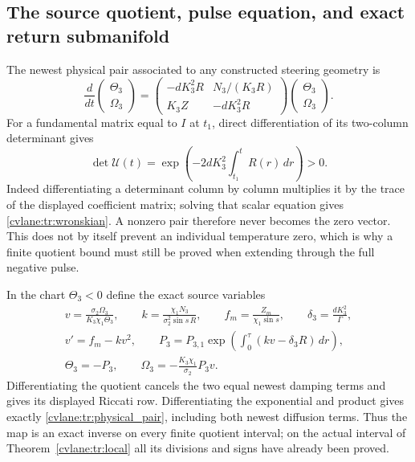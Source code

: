 \subsection{The source quotient, pulse equation, and exact return submanifold}

The newest physical pair associated to any constructed steering
geometry is
\begin{equation}\label{cvlane:tr:physical_pair}
 \frac d{dt}\begin{pmatrix}\Theta_3\\\Omega_3\end{pmatrix}
 =\begin{pmatrix}
 -dK_3^2R&N_3/(K_3R)\\
 K_3Z&-dK_3^2R
 \end{pmatrix}
 \begin{pmatrix}\Theta_3\\\Omega_3\end{pmatrix}.
\end{equation}
For a fundamental matrix equal to $I$ at $t_1$, direct
differentiation of its two-column determinant gives
\begin{equation}\label{cvlane:tr:wronskian}
 \det\mathcal U(t)=
 \exp\left(-2dK_3^2\int_{t_1}^tR(r)\,dr\right)>0.
\end{equation}
Indeed differentiating a determinant column by column multiplies it
by the trace of the displayed coefficient matrix; solving that scalar
equation gives \eqref{cvlane:tr:wronskian}. A nonzero pair therefore never
becomes the zero vector. This does not by itself prevent an individual
temperature zero, which is why a finite quotient bound must still be
proved when extending through the full negative pulse.

In the chart $\Theta_3<0$ define the exact source variables
\begin{equation}\label{cvlane:tr:quotient}
 \begin{gathered}
 v=\frac{\sigma_2\Omega_3}{K_3\chi_1\Theta_3},\qquad
 k=\frac{\chi_1N_3}{\sigma_2^2\sin s\,R},\qquad
 f_m=\frac{Z_m}{\chi_1\sin s},\qquad
 \delta_3=\frac{dK_3^2}{\Gamma},\\
 v'=f_m-kv^2,\qquad
 P_3=P_{3,1}\exp\left(\int_0^\tau(kv-\delta_3R)\,dr\right),\\
 \Theta_3=-P_3,\qquad
 \Omega_3=-\frac{K_3\chi_1}{\sigma_2}P_3v.
 \end{gathered}
\end{equation}
Differentiating the quotient cancels the two equal newest damping
terms and gives its displayed Riccati row. Differentiating the
exponential and product gives exactly \eqref{cvlane:tr:physical_pair},
including both newest diffusion terms. Thus the map is an exact
inverse on every finite quotient interval; on the actual interval
of Theorem~\ref{cvlane:tr:local} all its divisions and signs have already
been proved.

